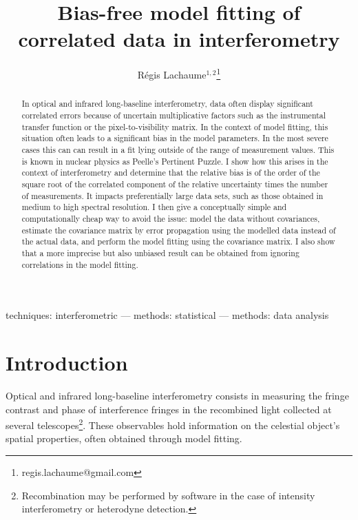 \documentclass{pasa}
\title[Bias-free model fitting of correlated data in interferometry]{Bias-free model fitting of correlated data in interferometry}
\author[Lachaume]{R\'egis Lachaume$^{1,2}$\thanks{regis.lachaume@gmail.com}
\affil{$^{1}$Instituto de Astronom\'\i{}a, Facultad de F\'\i{}sica, Pontificia Universidad Cat\'olica de Chile, casilla 306, Santiago 22, Chile}%
\affil{$^{2}$Max-Planck-Institut f\"ur Astronomie, K\"onigstuhl 17, D-69117 Heidelberg, Germany}%
}
\begin{document}
\begin{frontmatter}
\maketitle

\begin{abstract}
In optical and infrared long-baseline interferometry, data often display significant correlated errors because of uncertain multiplicative factors such as the instrumental transfer function or the pixel-to-visibility matrix.  In the context of model fitting, this situation often leads to a significant bias in the model parameters. In the most severe cases this can can result in a fit lying outside of the range of measurement values. This is known in nuclear physics as Peelle's Pertinent Puzzle.  I show how this arises in the context of interferometry and determine that the relative bias is of the order of the square root of the correlated component of the relative uncertainty times the number of measurements. It impacts preferentially large data sets, such as those obtained in medium to high spectral resolution.  I then give a conceptually simple and computationally cheap way to avoid the issue: model the data without covariances, estimate the covariance matrix by error propagation using the modelled data instead of the actual data, and perform the model fitting using the covariance matrix. I also show that a more imprecise but also unbiased result can be obtained from ignoring correlations in the model fitting.
\end{abstract}

\begin{keywords}
techniques: interferometric --- 
methods: statistical ---
methods: data analysis
\end{keywords}

\end{frontmatter}

\section{Introduction}

Optical and infrared long-baseline interferometry consists in measuring the fringe contrast and phase of interference fringes in the recombined light collected at several telescopes\footnote{Recombination may be performed by software in the case of intensity interferometry or heterodyne detection.}. These observables hold information on the celestial object's spatial properties, often obtained through model fitting. 
\end{document}
